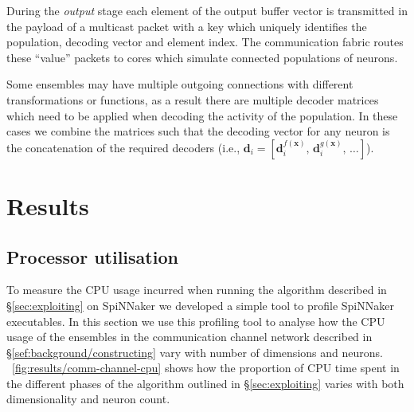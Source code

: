 \documentclass[conference]{IEEEtran}
\renewcommand{\vec}{\mathbf}  %
\begin{document}
  During the \textit{output} stage each element of the output buffer vector is transmitted in the payload of a multicast packet with a key which uniquely identifies the population, decoding vector and element index.
  The communication fabric routes these ``value'' packets to cores which simulate connected populations of neurons.

  Some ensembles may have multiple outgoing connections with different transformations or functions, as a result there are multiple decoder matrices which need to be applied when decoding the activity of the population.
  In these cases we combine the matrices such that the decoding vector for any neuron is the concatenation of the required decoders
  (i.e., $\vec{d}_i = \left[\vec{d}_i^{f(\vec{x})},\,\vec{d}_i^{g(\vec{x})},\,\ldots \right]$).

  \section{Results}
  \label{sec:results}

  \subsection{Processor utilisation}
To measure the CPU usage incurred when running the algorithm described in \S\ref{sec:exploiting} on SpiNNaker we developed a simple tool to profile SpiNNaker executables.
In this section we use this profiling tool to analyse how the CPU usage of the ensembles in the communication channel network described in \S\ref{sef:background/constructing} vary with number of dimensions and neurons.
\figurename~\ref{fig:results/comm-channel-cpu} shows how the proportion of CPU time spent in the different phases of the algorithm outlined in \S\ref{sec:exploiting} varies with both dimensionality and neuron count.
\end{document}
